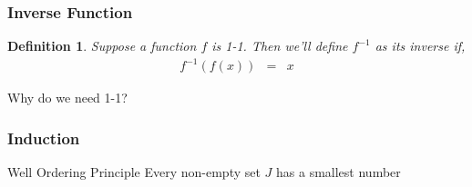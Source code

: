\documentclass{beamer}
\newtheorem{thm}{Theorem}
\newtheorem{defn}{Definition}
\numberwithin{equation}{section}
\begin{document}
\begin{frame}
\frametitle{Inverse Function}

\begin{defn}
Suppose a function $f$ is 1-1.  Then we'll define $f^{-1}$ as its \alert{inverse} if,
\begin{eqnarray}
f^{-1}(f(x)) & = & x \nonumber
\end{eqnarray}

\end{defn}

\alert{Why do we need 1-1?}


\end{frame}

\begin{frame}
\frametitle{Induction}

\alert{Well Ordering Principle} Every non-empty set $J$ has a smallest number \pause



\end{frame}
\end{document}
